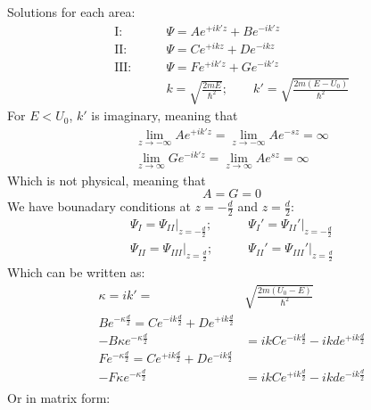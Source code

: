 		Solutions for each area:
		\begin{align}
			\text{I:}&\qquad \Psi = A e^{+ik'z} + B e^{-ik'z} \\
			\text{II:}&\qquad \Psi = C e^{+ikz} + D e^{-ikz} \\
			\text{III:}&\qquad \Psi = F e^{+ik'z} + G e^{-ik'z} \\
			&\qquad k = \sqrt{\frac{2mE}{\hbar^2}};\qquad k' = \sqrt{\frac{2m(E-U_0)}{\hbar^2}}
		\end{align}
		For $E < U_0$, $k'$ is imaginary, meaning that
		\begin{align}
			\lim_{z \to -\infty} Ae^{+ik'z} = \lim_{z \to -\infty} Ae^{-sz} = \infty \\
			\lim_{z \to \infty} Ge^{-ik'z} = \lim_{z \to \infty} Ae^{sz} = \infty
		\end{align}
		Which is not physical, meaning that 
		\begin{equation}
			A = G = 0
		\end{equation}
		We have bounadary conditions at $z = -\frac{d}{2}$ and $z = \frac{d}{2}$:
		\begin{align}
			\Psi_I = \Psi_{II}|_{z=-\frac{d}{2}};&\qquad  \Psi_I' = \Psi_{II}'|_{z=-\frac{d}{2}} \\
			\Psi_{II} = \Psi_{III}|_{z=\frac{d}{2}};&\qquad  \Psi_{II}' = \Psi_{III}'|_{z=\frac{d}{2}}
		\end{align}
		Which can be written as:
		\begin{align}
			\kappa = ik' =& \sqrt{\frac{2m(U_0-E)}{\hbar^2}} \\
			Be^{-\kappa\frac{d}{2}} = Ce^{-ik\frac{d}{2}} + De^{+ik\frac{d}{2}}&\\
			-B\kappa e^{-\kappa\frac{d}{2}} &= ikCe^{-ik\frac{d}{2}} - ikde^{+ik\frac{d}{2}}\\
			Fe^{-\kappa\frac{d}{2}} = Ce^{+ik\frac{d}{2}} + De^{-ik\frac{d}{2}}&\\
			-F\kappa e^{-\kappa\frac{d}{2}} &= ikCe^{+ik\frac{d}{2}} - ikde^{-ik\frac{d}{2}}\\
		\end{align}
		Or in matrix form:
